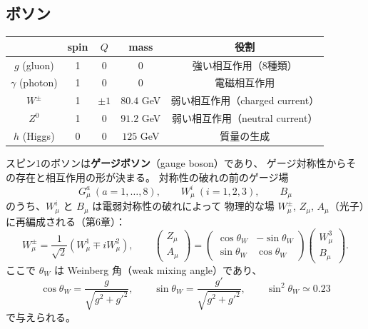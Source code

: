 \documentclass[uplatex,dvipdfmx,a4paper,11pt,openany]{jsbook}
\newcommand{\term}[2]{\textbf{#1}（#2）}
\newcommand{\en}[1]{（#1）}
\numberwithin{equation}{chapter}
\theoremstyle{definition}
\theoremstyle{plain}
\theoremstyle{remark}
\begin{document}
\subsection{ボソン}
\begin{center}
\renewcommand{\arraystretch}{1.3}
\begin{tabular}{ccccc}
\toprule
 & spin & $Q$ & mass & 役割\\
\midrule
$g$ (gluon) & 1 & 0 & 0 & 強い相互作用（8種類）\\
$\gamma$ (photon) & 1 & 0 & 0 & 電磁相互作用\\
$W^\pm$ & 1 & $\pm1$ & $80.4$ GeV & 弱い相互作用（charged current）\\
$Z^0$ & 1 & 0 & $91.2$ GeV & 弱い相互作用（neutral current）\\
$h$ (Higgs) & 0 & 0 & $125$ GeV & 質量の生成\\
\bottomrule
\end{tabular}
\end{center}
スピン1のボソンは\term{ゲージボソン}{gauge boson}であり、
ゲージ対称性からその存在と相互作用の形が決まる。
対称性の破れの前のゲージ場
\begin{equation}
G_\mu^a\ (a=1,\dots,8),\qquad
W_\mu^i\ (i=1,2,3),\qquad
B_\mu
\end{equation}
のうち、$W_\mu^i$ と $B_\mu$ は電弱対称性の破れによって
物理的な場 $W_\mu^\pm$, $Z_\mu$, $A_\mu$（光子）に再編成される（第6章）：
\begin{equation}
W_\mu^\pm=\frac{1}{\sqrt2}\left(W_\mu^1\mp iW_\mu^2\right),
\qquad
\begin{pmatrix}Z_\mu\\ A_\mu\end{pmatrix}
=
\begin{pmatrix}
\cos\theta_W & -\sin\theta_W\\
\sin\theta_W & \cos\theta_W
\end{pmatrix}
\begin{pmatrix}W_\mu^3\\ B_\mu\end{pmatrix}.
\label{eq:ZA-preview}
\end{equation}
ここで $\theta_W$ は Weinberg 角\en{weak mixing angle}であり、
\begin{equation}
\cos\theta_W=\frac{g}{\sqrt{g^2+g'^2}},\qquad
\sin\theta_W=\frac{g'}{\sqrt{g^2+g'^2}},\qquad
\sin^2\theta_W\simeq0.23
\end{equation}
で与えられる。
\end{document}
